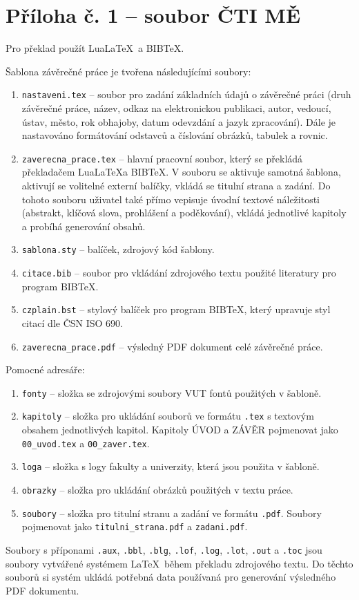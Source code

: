 \chapter{Příloha č. 1 -- soubor ČTI MĚ}
Pro překlad použít Lua\LaTeX\ a BIB\TeX.

Šablona závěrečné práce je tvořena následujícími soubory:

\begin{enumerate}
	\item \verb|nastaveni.tex| -- soubor pro zadání základních údajů o závěrečné práci (druh závěrečné práce, název, odkaz na elektronickou publikaci, autor, vedoucí, ústav, město, rok obhajoby, datum odevzdání a jazyk zpracování). Dále je nastavováno formátování odstavců a číslování obrázků, tabulek a rovnic.
	\item \verb|zaverecna_prace.tex| -- hlavní pracovní soubor, který se překládá překladačem Lua\LaTeX a BIB\TeX. V souboru se aktivuje samotná šablona, aktivují se volitelné externí balíčky, vkládá se titulní strana a zadání. Do tohoto souboru uživatel také přímo vepisuje úvodní textové náležitosti (abstrakt, klíčová slova, prohlášení a poděkování), vkládá jednotlivé kapitoly a probíhá generování obsahů.
	\item \verb|sablona.sty| -- balíček, zdrojový kód šablony.
	\item \verb|citace.bib| -- soubor pro vkládání zdrojového textu použité literatury pro program BIB\TeX.
	\item \verb|czplain.bst| -- stylový balíček pro program BIB\TeX, který upravuje styl citací dle ČSN ISO 690.
	\item \verb|zaverecna_prace.pdf| -- výsledný PDF dokument celé závěrečné práce.	
\end{enumerate}

Pomocné adresáře:

\begin{enumerate}
	\item \verb|fonty| -- složka se zdrojovými soubory VUT fontů použitých v šabloně.
	\item \verb|kapitoly| -- složka pro ukládání souborů ve formátu \verb|.tex| s textovým obsahem jednotlivých kapitol. Kapitoly ÚVOD a ZÁVĚR pojmenovat jako \verb|00_uvod.tex| a \verb|00_zaver.tex|.
	\item \verb|loga| -- složka s logy fakulty a univerzity, která jsou použita v šabloně.
	\item \verb|obrazky| -- složka pro ukládání obrázků použitých v textu práce.
	\item \verb|soubory| -- složka pro titulní stranu a zadání ve formátu \verb|.pdf|. Soubory pojmenovat jako \verb|titulni_strana.pdf| a \verb|zadani.pdf|.
\end{enumerate}

Soubory s příponami \verb|.aux|, \verb|.bbl|, \verb|.blg|, \verb|.lof|, \verb|.log|, \verb|.lot|, \verb|.out| a \verb|.toc| jsou soubory vytvářené systémem \LaTeX\ během překladu zdrojového textu. Do těchto souborů si systém ukládá potřebná data používaná pro generování výsledného PDF dokumentu.